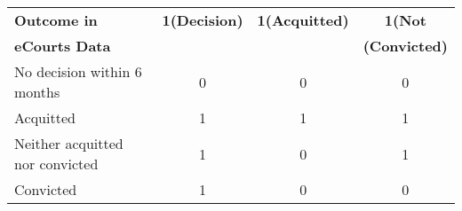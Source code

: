 \begin{tabular}{lccc}
\hline 
\textbf{Outcome in}             & \textbf{1(Decision)} & \textbf{1(Acquitted)} & \textbf{1(Not} \\
\textbf{eCourts Data}           &                          &                       &        \textbf{(Convicted)}                 \\
\hline                          
No decision within 6 months        & 0                        & 0                    & 0                        \\
Acquitted                       & 1                        & 1                     & 1                         \\
Neither acquitted nor convicted & 1                        & 0                     & 1                         \\
Convicted                       & 1                        & 0                     & 0                         \\
\hline
\end{tabular}
